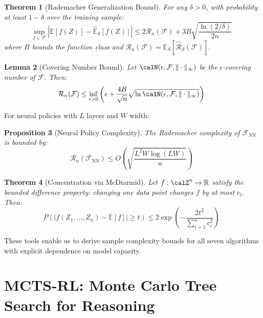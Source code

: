 \documentclass[11pt,a4paper]{article}
\newtheorem{theorem}{Theorem}[section]
\newtheorem{lemma}[theorem]{Lemma}
\newtheorem{proposition}[theorem]{Proposition}
\newcommand{\E}{\mathbb{E}}
\newcommand{\R}{\mathbb{R}}
\newcommand{\calF}{\mathcal{F}}
\newcommand{\calR}{\mathcal{R}}
\begin{document}
\begin{theorem}[Rademacher Generalization Bound]
\label{thm:rademacher}
For any $\delta > 0$, with probability at least $1-\delta$ over the training sample:
\begin{equation}
    \sup_{f \in \calF} |\E[f(Z)] - \hat{\E}_S[f(Z)]| \leq 2\calR_n(\calF) + 3B\sqrt{\frac{\ln(2/\delta)}{2n}}
\end{equation}
where $B$ bounds the function class and $\calR_n(\calF) = \E_S[\hat{\calR}_S(\calF)]$.
\end{theorem}

\begin{lemma}[Covering Number Bound]
\label{lem:covering}
Let $\calN(\epsilon, \calF, \|\cdot\|_\infty)$ be the $\epsilon$-covering number of $\calF$. Then:
\begin{equation}
    \calR_n(\calF) \leq \inf_{\epsilon > 0}\left(\epsilon + \frac{4B}{\sqrt{n}}\sqrt{\ln \calN(\epsilon, \calF, \|\cdot\|_\infty)}\right)
\end{equation}
\end{lemma}

For neural policies with $L$ layers and $W$ width:

\begin{proposition}[Neural Policy Complexity]
\label{prop:nn_complexity}
The Rademacher complexity of $\calF_{\text{NN}}$ is bounded by:
\begin{equation}
    \calR_n(\calF_{\text{NN}}) \leq O\left(\sqrt{\frac{L^2 W \log(LW)}{n}}\right)
\end{equation}
\end{proposition}

\begin{theorem}[Concentration via McDiarmid]
\label{thm:mcdiarmid}
Let $f: \calZ^n \to \R$ satisfy the bounded difference property: changing one data point changes $f$ by at most $c_i$. Then:
\begin{equation}
    P\left(|f(Z_1, \ldots, Z_n) - \E[f]| \geq t\right) \leq 2\exp\left(-\frac{2t^2}{\sum_{i=1}^n c_i^2}\right)
\end{equation}
\end{theorem}

These tools enable us to derive sample complexity bounds for all seven algorithms with explicit dependence on model capacity.

\section{MCTS-RL: Monte Carlo Tree Search for Reasoning}
\end{document}

